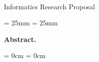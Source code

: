 \thispagestyle{plain}

\begin{center}
  \Huge
  \textbf{\@title}\\
  \vspace{.5em}
  \normalsize
  Informatics Research Proposal\\
  \@author
  \vspace{.4em}
\end{center}

\newcommand{\abstractmargin}{25mm}

\leftskip  = \abstractmargin
\rightskip = \abstractmargin

\small
\noindent
\textbf{Abstract.}


\leftskip  = 0cm
\rightskip = 0cm
